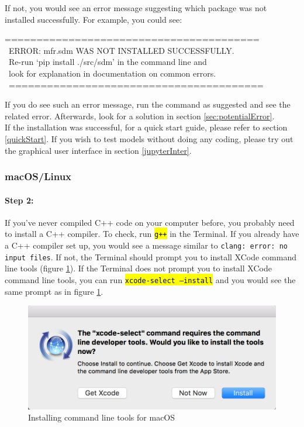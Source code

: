 \documentclass[12pt]{article}
\DeclareRobustCommand{\hlCODE}[1]{{\sethlcolor{backcolour}\hl{#1}}}
\begin{document}
If not, you would see an error message suggesting which package was not installed successfully. For example, you could see:\\
\begin{tcolorbox}
========================================\\\
ERROR: mfr.sdm WAS NOT INSTALLED SUCCESSFULLY.\\\
Re-run `pip install ./src/sdm' in the command line and \\\
look for explanation in documentation on common errors.\\\
========================================
  \end{tcolorbox}
  
If you do see such an error message, run the command as suggested and see the related error. Afterwards, look for a solution in section \ref{sec:potentialError}. \\

If the installation was successful,  for a quick start guide, please refer to section \ref{quickStart}. If you wish to test models without doing any coding, please try out the graphical user interface in section \ref{jupyterInter}.

\subsubsection{macOS/Linux}

\paragraph{Step 2:} If you've never compiled C++ code on your computer before, you probably need to install a C++ compiler. To check, run \hlCODE{\texttt{g++}} in the Terminal. If you already have a C++ compiler set up, you would see a message similar to \texttt{clang: error: no input files}. If not, the Terminal should prompt you to install XCode command line tools (figure \ref{fig:xcodeCommand}). If the Terminal does not prompt you to install XCode command line tools, you can run \hlCODE{\texttt{xcode-select --install}} and you would see the same prompt as in figure \ref{fig:xcodeCommand}.

\begin{figure}[H]
\centering
\includegraphics[scale=0.4]{xcodeCommand}
\caption{Installing command line tools for macOS}\label{fig:xcodeCommand}
\end{figure}
\end{document}
